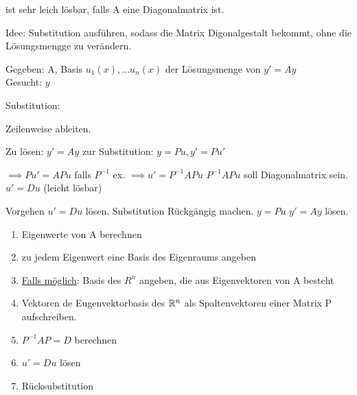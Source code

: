 \documentclass{../tudscript}
\begin{document}
    ist sehr leich lösbar, falls A eine Diagonalmatrix ist.

    Idee: Substitution ausführen, sodass die Matrix Digonalgestalt bekommt,
    ohne die Lösungsmengge zu verändern.

    Gegeben: A, Basis $u_1 (x), \ldots u_n (x)$ der Lösungsmenge von $y' = Ay$ \\
    Gesucht: $y$

    Substitution:
   
    Zeilenweise ableiten.
    
    Zu lösen: $y' = Ay$ zur Substitution: $y = Pu, y' = Pu'$

    $\implies Pu' = APu$
    falls $P^{-1}$ ex.
    $\implies u' = P^{-1}APu$
    $P^{-1}APu$ soll Diagonalmatrix sein.
    $u' = D u$ (leicht lösbar)
   
    Vorgehen $u' =Du$ lösen. Substitution Rückgängig machen. $y = Pu$ 
    $y' = Ay$ lösen.
    \begin{enumerate}
        \item Eigenwerte von A berechnen
        \item zu jedem Eigenwert eine Basis des Eigenraums angeben
        \item \underline{Falls möglich}: Basis des $R^n$ angeben, die aus Eigenvektoren von A besteht
        \item Vektoren de Eugenvektorbasis des $\mathbb{R}^n$ als Spaltenvektoren einer Matrix P aufschreiben.
        \item $P^{-1} A P = D$ berechnen
        \item $u' = D u$ lösen
        \item Rücksubstitution
    \end{enumerate}
\end{document}
